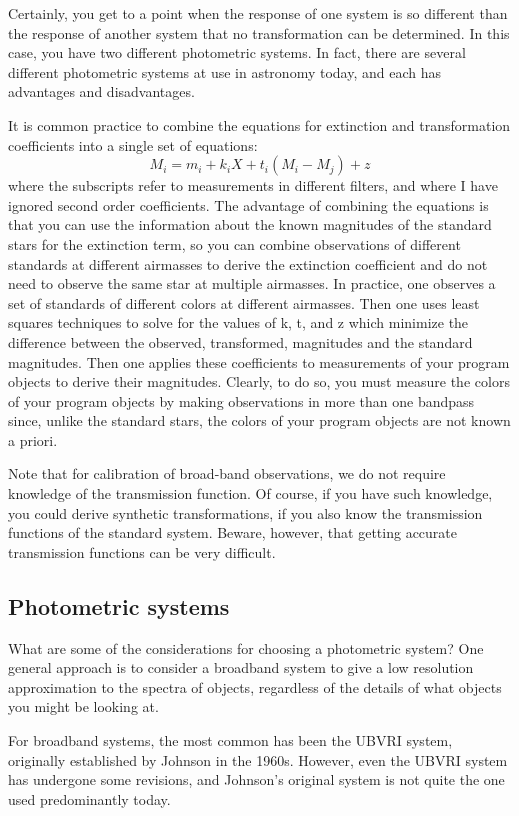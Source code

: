 \documentclass[12pt]{article}
\begin{document}
Certainly, you get to a point when the response of one system is so
different than the response of another system that no transformation
can be determined. In this case, you have two different photometric
systems. In fact, there are several different photometric systems at
use in astronomy today, and each has advantages and disadvantages.

It is common practice to combine the equations for extinction and
transformation coefficients into a single set of equations:
\[
    M_{i} = m_{i} + k_{i}X + t_{i}(M_{i} - M_{j}) + z
    \]
where the subscripts refer to measurements in different filters, and
where I have ignored second order coefficients. The advantage of
combining the equations is that you can use the information about the
known magnitudes of the standard stars for the extinction term, so you
can combine observations of different standards at different airmasses
to derive the extinction coefficient and do not need to observe the
same star at multiple airmasses.
In practice, one observes a set of standards of different colors at
different airmasses. Then one uses least squares techniques to solve
for the values of k, t, and z which minimize the difference between
the observed, transformed, magnitudes and the standard magnitudes.
Then one applies these coefficients to measurements of your program
objects to derive their magnitudes. Clearly, to do so, you must
measure the colors of your program objects by making observations in
more than one bandpass since, unlike the standard stars, the colors of
your program objects are not known a priori.

Note that for calibration of broad-band observations, we do not
require knowledge of the transmission function. Of course, if you have
such knowledge, you could derive synthetic transformations, if you
also know the transmission functions of the standard system. Beware,
however, that getting accurate transmission functions can be very
difficult.

\subsection{Photometric systems}
What are some of the considerations for choosing a photometric system?
One general approach is to consider a broadband system to give a low
resolution approximation to the spectra of objects, regardless of the
details of what objects you might be looking at.

For broadband systems, the most common has been the UBVRI system,
originally established by Johnson in the 1960s. However, even the
UBVRI system has undergone some revisions, and Johnson's original
system is not quite the one used predominantly today.
\end{document}
